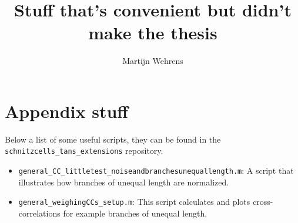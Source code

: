 \documentclass[]{report}
\begin{document}
	
\title{Stuff that's convenient but didn't make the thesis}
\author{Martijn Wehrens}	
	
\maketitle










\chapter*{Appendix stuff}

\begin{sloppypar}
    Below a list of some useful scripts, they can be found in the \nolinkurl{schnitzcells_tans_extensions} repository.
\end{sloppypar}

\begin{itemize}
    \item[]
    \nolinkurl{general_CC_littletest_noiseandbranchesunequallength.m}: 
    A script that illustrates how branches of unequal length are normalized.
    \item[]
    \nolinkurl{general_weighingCCs_setup.m}: 
    This script calculates and plots cross-correlations for example branches of unequal length.
\end{itemize}
\end{document}
